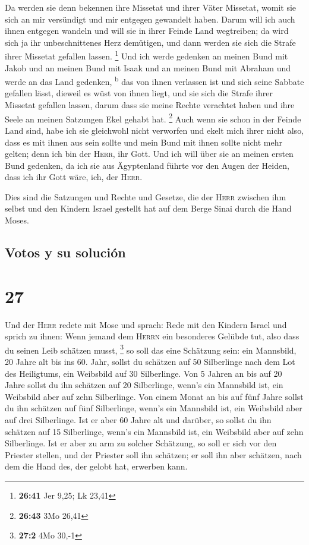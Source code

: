  Da werden sie denn bekennen ihre Missetat und ihrer
Väter Missetat, womit sie sich an mir versündigt und mir entgegen
gewandelt haben.  Darum will ich auch ihnen entgegen
wandeln und will sie in ihrer Feinde Land wegtreiben; da wird sich ja
ihr unbeschnittenes Herz demütigen, und dann werden sie sich die Strafe
ihrer Missetat gefallen lassen. \footnote{\textbf{26:41} Jer 9,25; Lk
  23,41}  Und ich werde gedenken an meinen Bund mit Jakob
und an meinen Bund mit Isaak und an meinen Bund mit Abraham und werde an
das Land gedenken, \textsuperscript{b}  das von ihnen
verlassen ist und sich seine Sabbate gefallen lässt, dieweil es wüst von
ihnen liegt, und sie sich die Strafe ihrer Missetat gefallen lassen,
darum dass sie meine Rechte verachtet haben und ihre Seele an meinen
Satzungen Ekel gehabt hat. \footnote{\textbf{26:43} 3Mo 26,41}
 Auch wenn sie schon in der Feinde Land sind, habe ich
sie gleichwohl nicht verworfen und ekelt mich ihrer nicht also, dass es
mit ihnen aus sein sollte und mein Bund mit ihnen sollte nicht mehr
gelten; denn ich bin der \textsc{Herr}, ihr Gott.  Und
ich will über sie an meinen ersten Bund gedenken, da ich sie aus
Ägyptenland führte vor den Augen der Heiden, dass ich ihr Gott wäre,
ich, der \textsc{Herr}.

 Dies sind die Satzungen und Rechte und Gesetze, die der
\textsc{Herr} zwischen ihm selbst und den Kindern Israel gestellt hat
auf dem Berge Sinai durch die Hand Moses.

\hypertarget{votos-y-su-soluciuxf3n}{%
\subsection{Votos y su solución}\label{votos-y-su-soluciuxf3n}}

\hypertarget{section-26}{%
\section{27}\label{section-26}}

 Und der \textsc{Herr} redete mit Mose und sprach:
 Rede mit den Kindern Israel und sprich zu ihnen: Wenn
jemand dem \textsc{Herrn} ein besonderes Gelübde tut, also dass du
seinen Leib schätzen musst, \footnote{\textbf{27:2} 4Mo 30,-1}
 so soll das eine Schätzung sein: ein Mannsbild, 20 Jahre
alt bis ins 60. Jahr, sollst du schätzen auf 50 Silberlinge nach dem Lot
des Heiligtums,  ein Weibsbild auf 30 Silberlinge.
 Von 5 Jahren an bis auf 20 Jahre sollst du ihn schätzen
auf 20 Silberlinge, wenn's ein Mannsbild ist, ein Weibsbild aber auf
zehn Silberlinge.  Von einem Monat an bis auf fünf Jahre
sollst du ihn schätzen auf fünf Silberlinge, wenn's ein Mannsbild ist,
ein Weibsbild aber auf drei Silberlinge.  Ist er aber 60
Jahre alt und darüber, so sollst du ihn schätzen auf 15 Silberlinge,
wenn's ein Mannsbild ist, ein Weibsbild aber auf zehn Silberlinge.
 Ist er aber zu arm zu solcher Schätzung, so soll er sich
vor den Priester stellen, und der Priester soll ihn schätzen; er soll
ihn aber schätzen, nach dem die Hand des, der gelobt hat, erwerben kann.

